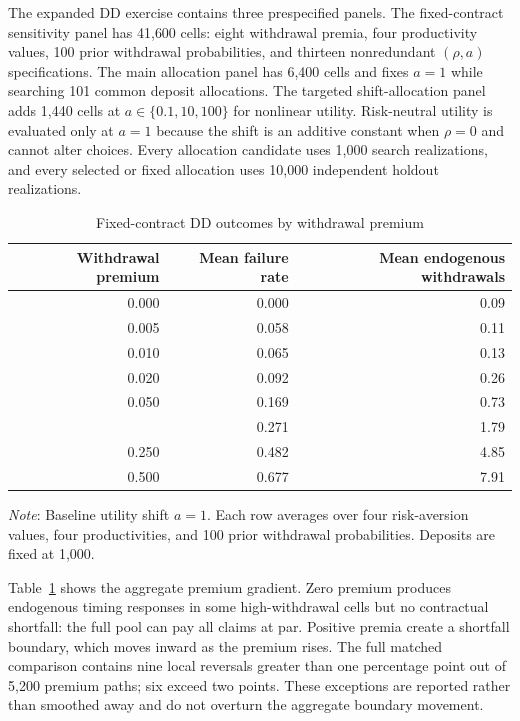 \documentclass[12pt]{article}\usepackage[]{graphicx}\usepackage[]{xcolor}
\begin{document}
The expanded DD exercise contains three prespecified panels.
The fixed-contract sensitivity panel has 41{,}600 cells: eight withdrawal premia, four productivity values, 100 prior withdrawal probabilities, and thirteen nonredundant $(\rho,a)$ specifications.
The main allocation panel has 6{,}400 cells and fixes $a=1$ while searching 101 common deposit allocations.
The targeted shift-allocation panel adds 1{,}440 cells at $a\in\{0.1,10,100\}$ for nonlinear utility.
Risk-neutral utility is evaluated only at $a=1$ because the shift is an additive constant when $\rho=0$ and cannot alter choices.
Every allocation candidate uses 1{,}000 search realizations, and every selected or fixed allocation uses 10{,}000 independent holdout realizations.

\begin{table}[ht]
\centering
\small
\caption{Fixed-contract DD outcomes by withdrawal premium}
\label{tab:ddexpanded}

\begin{tabular}{rrr}
\toprule
Withdrawal premium & Mean failure rate & Mean endogenous withdrawals\\
\midrule
0.000 & 0.000 & 0.09\\
0.005 & 0.058 & 0.11\\
0.010 & 0.065 & 0.13\\
0.020 & 0.092 & 0.26\\
0.050 & 0.169 & 0.73\\
\addlinespace
0.100 & 0.271 & 1.79\\
0.250 & 0.482 & 4.85\\
0.500 & 0.677 & 7.91\\
\bottomrule
\end{tabular}


\smallskip

\small\textit{Note}: Baseline utility shift $a=1$. Each row averages
over four risk-aversion values, four productivities, and 100 prior
withdrawal probabilities. Deposits are fixed at 1{,}000.
\end{table}

Table~\ref{tab:ddexpanded} shows the aggregate premium gradient.
Zero premium produces endogenous timing responses in some high-withdrawal cells but no contractual shortfall: the full pool can pay all claims at par.
Positive premia create a shortfall boundary, which moves inward as the premium rises.
The full matched comparison contains nine local reversals greater than one percentage point out of 5{,}200 premium paths; six exceed two points.
These exceptions are reported rather than smoothed away and do not overturn the aggregate boundary movement.
\end{document}
